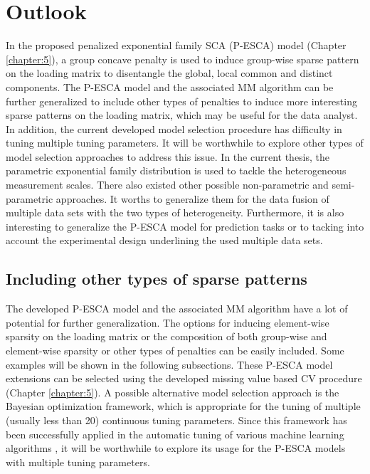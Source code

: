 \chapter{Outlook} \label{chapter:6}
In the proposed penalized exponential family SCA (P-ESCA) model (Chapter \ref{chapter:5}), a group concave penalty is used to induce group-wise sparse pattern on the loading matrix to disentangle the global, local common and distinct components. The P-ESCA model and the associated MM algorithm can be further generalized to include other types of penalties to induce more interesting sparse patterns on the loading matrix, which may be useful for the data analyst. In addition, the current developed model selection procedure has difficulty in tuning multiple tuning parameters. It will be worthwhile to explore other types of model selection approaches to address this issue. In the current thesis, the parametric exponential family distribution is used to tackle the heterogeneous measurement scales. There also existed other possible non-parametric and semi-parametric approaches. It worths to generalize them for the data fusion of multiple data sets with the two types of heterogeneity. Furthermore, it is also interesting to generalize the P-ESCA model for prediction tasks or to tacking into account the experimental design underlining the used multiple data sets.

\section{Including other types of sparse patterns}
The developed P-ESCA model and the associated MM algorithm have a lot of potential for further generalization. The options for inducing element-wise sparsity on the loading matrix or the composition of both group-wise and element-wise sparsity or other types of penalties can be easily included. Some examples will be shown in the following subsections. These P-ESCA model extensions can be selected using the developed missing value based CV procedure (Chapter \ref{chapter:5}). A possible alternative model selection approach is the Bayesian optimization \cite{frazier2018tutorial} framework, which is appropriate for the tuning of multiple (usually less than 20) continuous tuning parameters. Since this framework has been successfully applied in the automatic tuning of various machine learning algorithms \cite{snoek2012practical}, it will be worthwhile to explore its usage for the P-ESCA models with multiple tuning parameters.

